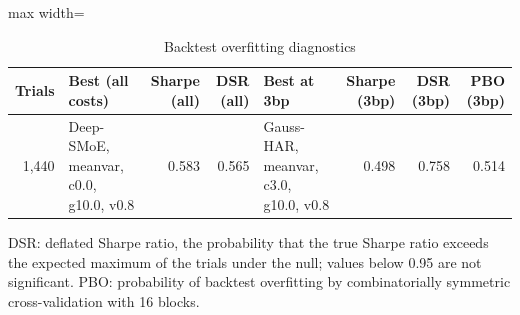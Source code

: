 \begin{table}[!htbp]\centering\small
\caption{Backtest overfitting diagnostics}\label{tab:overfit}
\begin{adjustbox}{max width=\textwidth}
\begin{tabular}{rp{3.5cm}rrp{3.5cm}rrr}
\toprule
Trials & Best (all costs) & Sharpe (all) & DSR (all) & Best at 3bp & Sharpe (3bp) & DSR (3bp) & PBO (3bp)\\
\midrule
1,440 & Deep-SMoE, meanvar, c0.0, g10.0, v0.8 & 0.583 & 0.565 & Gauss-HAR, meanvar, c3.0, g10.0, v0.8 & 0.498 & 0.758 & 0.514\\
\bottomrule
\end{tabular}
\end{adjustbox}
\par\smallskip\begin{minipage}{\textwidth}\footnotesize
DSR: deflated Sharpe ratio, the probability that the true Sharpe ratio exceeds the expected maximum of the trials under the null; values below 0.95 are not significant. PBO: probability of backtest overfitting by combinatorially symmetric cross-validation with 16 blocks.
\end{minipage}
\end{table}